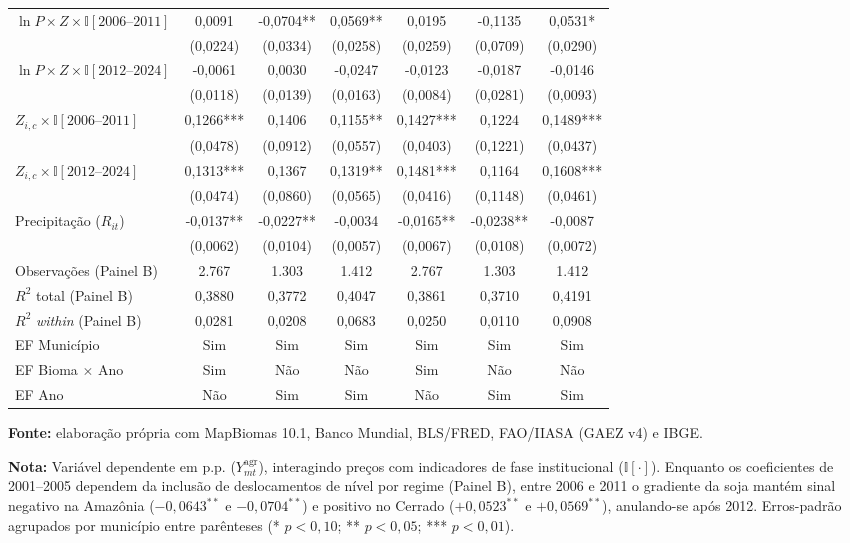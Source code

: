 \begin{table}[htbp]
\begin{tabular}{lcccccc}
$\ln P \times Z \times \mathbb{I}[2006\text{--}2011]$ & 0,0091 & -0,0704** & 0,0569** & 0,0195 & -0,1135 & 0,0531* \\
 & (0,0224) & (0,0334) & (0,0258) & (0,0259) & (0,0709) & (0,0290) \\
$\ln P \times Z \times \mathbb{I}[2012\text{--}2024]$ & -0,0061 & 0,0030 & -0,0247 & -0,0123 & -0,0187 & -0,0146 \\
 & (0,0118) & (0,0139) & (0,0163) & (0,0084) & (0,0281) & (0,0093) \\
$Z_{i,c} \times \mathbb{I}[2006\text{--}2011]$ & 0,1266*** & 0,1406 & 0,1155** & 0,1427*** & 0,1224 & 0,1489*** \\
 & (0,0478) & (0,0912) & (0,0557) & (0,0403) & (0,1221) & (0,0437) \\
$Z_{i,c} \times \mathbb{I}[2012\text{--}2024]$ & 0,1313*** & 0,1367 & 0,1319** & 0,1481*** & 0,1164 & 0,1608*** \\
 & (0,0474) & (0,0860) & (0,0565) & (0,0416) & (0,1148) & (0,0461) \\
Precipitação ($R_{it}$) & -0,0137** & -0,0227** & -0,0034 & -0,0165** & -0,0238** & -0,0087 \\
 & (0,0062) & (0,0104) & (0,0057) & (0,0067) & (0,0108) & (0,0072) \\
\midrule
Observações (Painel B) & 2.767 & 1.303 & 1.412 & 2.767 & 1.303 & 1.412 \\
$R^2$ total (Painel B) & 0,3880 & 0,3772 & 0,4047 & 0,3861 & 0,3710 & 0,4191 \\
$R^2$ \textit{within} (Painel B) & 0,0281 & 0,0208 & 0,0683 & 0,0250 & 0,0110 & 0,0908 \\
EF Município & Sim & Sim & Sim & Sim & Sim & Sim \\
EF Bioma $\times$ Ano & Sim & Não & Não & Sim & Não & Não \\
EF Ano & Não & Sim & Sim & Não & Sim & Sim \\
\bottomrule
\end{tabular}
\par\smallskip\begin{minipage}{\textwidth}\footnotesize
\SingleSpacing
\noindent\textbf{Fonte:} elaboração própria com MapBiomas 10.1, Banco Mundial, BLS/FRED, FAO/IIASA (GAEZ v4) e IBGE.\par\medskip
\noindent\textbf{Nota:} Variável dependente em p.p. ($Y_{mt}^{\text{agr}}$), interagindo preços com indicadores de fase institucional ($\mathbb{I}[\cdot]$). Enquanto os coeficientes de 2001--2005 dependem da inclusão de deslocamentos de nível por regime (Painel B), entre 2006 e 2011 o gradiente da soja mantém sinal negativo na Amazônia ($-0{,}0643^{**}$ e $-0{,}0704^{**}$) e positivo no Cerrado ($+0{,}0523^{**}$ e $+0{,}0569^{**}$), anulando-se após 2012. Erros-padrão agrupados por município entre parênteses (* $p<0{,}10$; ** $p<0{,}05$; *** $p<0{,}01$).
\end{minipage}
\end{table}
